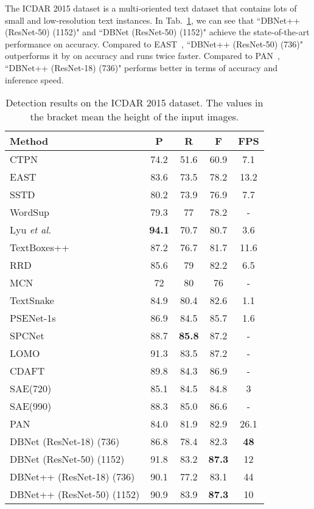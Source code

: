 The ICDAR 2015 dataset is a multi-oriented text dataset that contains lots of small and low-resolution text instances.
In Tab.~\ref{tab:ic15}, we can see that ``DBNet++ (ResNet-50) (1152)" and ``DBNet (ResNet-50) (1152)" achieve the state-of-the-art performance on accuracy. 
Compared to EAST~\cite{east}, ``DBNet++ (ResNet-50) (736)" outperforms it by  on accuracy and runs twice faster. Compared to PAN~\cite{wang2019efficient}, ``DBNet++ (ResNet-18) (736)" performs better in terms of accuracy and inference speed. 

\begin{table}[ht]
\setlength{\tabcolsep}{9.5pt}
\centering
\caption{Detection results on the ICDAR 2015 dataset. The values in the bracket mean the height of the input images.}
\begin{tabularx}{1.0\linewidth}{lc*{3}c}
\toprule
Method        & P    & R    & F    & FPS  \\ \midrule
CTPN~\cite{eccv/TianHHH016}          & 74.2 & 51.6 & 60.9 & 7.1  \\ 
EAST~\cite{east}          & 83.6 & 73.5 & 78.2 & 13.2 \\ 
SSTD~\cite{sstd}          & 80.2 & 73.9 & 76.9 & 7.7  \\ 
WordSup~\cite{hu2017wordsup}       & 79.3 & 77   & 78.2 & -  \\ 
Lyu \textit{et al.}~\cite{lyu2018multi}    & \textbf{94.1} & 70.7 & 80.7 & 3.6  \\ 
TextBoxes++~\cite{TextBoxes++}   & 87.2 & 76.7 & 81.7 & 11.6 \\ 
RRD~\cite{liao2018rotation}           & 85.6 & 79   & 82.2 & 6.5  \\ 
MCN~\cite{mcn}           & 72   & 80   & 76   & -  \\ 
TextSnake~\cite{long2018textsnake}     & 84.9 & 80.4 & 82.6 & 1.1  \\ 
PSENet-1s~\cite{wang2019shape}    & 86.9 & 84.5 & 85.7 & 1.6  \\ 
SPCNet~\cite{spc}       & 88.7 & \textbf{85.8} & 87.2 & -  \\ 
LOMO~\cite{lomo}      & 91.3 & 83.5 & 87.2 & -  \\ 
CDAFT~\cite{craft}      & 89.8 & 84.3 & 86.9 & -  \\ 
SAE(720)~\cite{tian2019learning}  & 85.1  & 84.5  & 84.8  & 3       \\ 
SAE(990)~\cite{tian2019learning}  & 88.3   & 85.0  & 86.6  & -       \\ 
PAN~\cite{wang2019efficient}  & 84.0   & 81.9  & 82.9  & 26.1       \\ 
\midrule  
DBNet (ResNet-18) (736)~\cite{LiaoWYCB20} & 86.8 & 78.4 & 82.3 & \textbf{48}   \\ 
DBNet (ResNet-50) (1152)~\cite{LiaoWYCB20} & 91.8   & 83.2 & \textbf{87.3} & 12   \\ 
\midrule  
DBNet++ (ResNet-18) (736) & 90.1 & 77.2 & 83.1 & 44  \\ 
DBNet++ (ResNet-50) (1152) & 90.9 & 83.9 & \textbf{87.3} & 10   \\ 
\bottomrule
\end{tabularx}
\label{tab:ic15}
\end{table}


